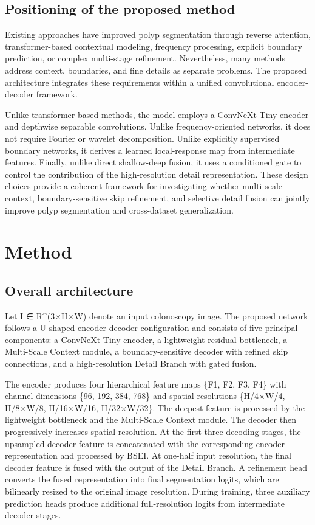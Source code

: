\subsection{Positioning of the proposed
method}\label{positioning-of-the-proposed-method}

Existing approaches have improved polyp segmentation through reverse
attention, transformer-based contextual modeling, frequency processing,
explicit boundary prediction, or complex multi-stage refinement.
Nevertheless, many methods address context, boundaries, and fine details
as separate problems. The proposed architecture integrates these
requirements within a unified convolutional encoder-decoder framework.

Unlike transformer-based methods, the model employs a ConvNeXt-Tiny
encoder and depthwise separable convolutions. Unlike frequency-oriented
networks, it does not require Fourier or wavelet decomposition. Unlike
explicitly supervised boundary networks, it derives a learned
local-response map from intermediate features. Finally, unlike direct
shallow-deep fusion, it uses a conditioned gate to control the
contribution of the high-resolution detail representation. These design
choices provide a coherent framework for investigating whether
multi-scale context, boundary-sensitive skip refinement, and selective
detail fusion can jointly improve polyp segmentation and cross-dataset
generalization.

\section{Method}\label{method}

\subsection{Overall architecture}\label{overall-architecture}

Let I ∈ R\^{}(3×H×W) denote an input colonoscopy image. The proposed
network follows a U-shaped encoder-decoder configuration and consists of
five principal components: a ConvNeXt-Tiny encoder, a lightweight
residual bottleneck, a Multi-Scale Context module, a boundary-sensitive
decoder with refined skip connections, and a high-resolution Detail
Branch with gated fusion.

The encoder produces four hierarchical feature maps \{F1, F2, F3, F4\}
with channel dimensions \{96, 192, 384, 768\} and spatial resolutions
\{H/4×W/4, H/8×W/8, H/16×W/16, H/32×W/32\}. The deepest feature is
processed by the lightweight bottleneck and the Multi-Scale Context
module. The decoder then progressively increases spatial resolution. At
the first three decoding stages, the upsampled decoder feature is
concatenated with the corresponding encoder representation and processed
by BSEI. At one-half input resolution, the final decoder feature is
fused with the output of the Detail Branch. A refinement head converts
the fused representation into final segmentation logits, which are
bilinearly resized to the original image resolution. During training,
three auxiliary prediction heads produce additional full-resolution
logits from intermediate decoder stages.

